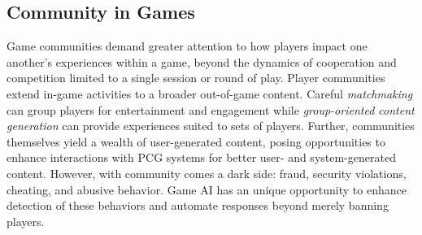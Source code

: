 \documentclass[conference]{IEEEtran}
\begin{document}

\subsection{Community in Games}

Game communities demand greater attention to how players impact one another's experiences within a game, beyond the dynamics of cooperation and competition limited to a single session or round of play. 
Player communities extend in-game activities to a broader out-of-game content.
%
Careful {\em matchmaking} can group players for entertainment and engagement while {\em group-oriented content generation} can provide experiences suited to sets of players.
Further, communities themselves yield a wealth of user-generated content, posing opportunities to enhance interactions with PCG systems for better user- and system-generated content.
However, with community comes a dark side: fraud, security violations, cheating, and abusive behavior. 
Game AI has an unique opportunity to enhance detection of these behaviors and automate responses beyond merely banning players.

\end{document}
